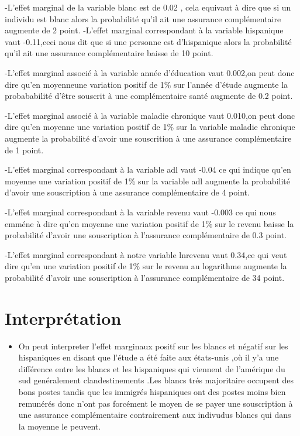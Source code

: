 \documentclass[
  14pt,
  french,
]{article}
\providecommand{\tightlist}{%
  \setlength{\itemsep}{0pt}\setlength{\parskip}{0pt}}
\begin{document}
-L'effet marginal de la variable blanc est de 0.02 , cela equivaut à
dire que si un individu est blanc alors la probabilité qu'il ait une
assurance complémentaire augmente de 2 point. -L'effet marginal
correspondant à la variable hispanique vaut -0.11,ceci nous dit que si
une personne est d'hispanique alors la probabilité qu'il ait une
assurance complémentaire baisse de 10 point.

-L'effet marginal associé à la variable année d'éducation vaut 0.002,on
peut donc dire qu'en moyenneune variation positif de 1\% sur l'année
d'étude augmente la probababilité d'être souscrit à une complémentaire
santé augmente de 0.2 point.

-L'effet marginal associé à la variable maladie chronique vaut 0.010,on
peut donc dire qu'en moyenne une variation positif de 1\% sur la
variable maladie chronique augmente la probabilité d'avoir une
souscrition à une assurance complémentaire de 1 point.

-L'effet marginal correspondant à la variable adl vaut -0.04 ce qui
indique qu'en moyenne une variation positif de 1\% sur la variable adl
augmente la probabilité d'avoir une souscription à une assurance
complémentaire de 4 point.

-L'effet marginal correspondant à la variable revenu vaut -0.003 ce qui
nous emméne à dire qu'en moyenne une variation positif de 1\% sur le
revenu baisse la probabilité d'avoir une souscription à l'assurance
complémentaire de 0.3 point.

-L'effet marginal correspondant à notre variable lnrevenu vaut 0.34,ce
qui veut dire qu'en une variation positif de 1\% sur le revenu au
logarithme augmente la probabilité d'avoir une souscription à
l'assurance complémentaire de 34 point.

\hypertarget{interpruxe9tation}{%
\section{Interprétation}\label{interpruxe9tation}}

\begin{itemize}
\tightlist
\item
  On peut interpreter l'effet marginaux positf sur les blancs et négatif
  sur les hispaniques en disant que l'étude a été faite aux états-unis
  ,où il y'a une différence entre les blancs et les hispaniques qui
  viennent de l'amérique du sud genéralement clandestinements .Les
  blancs trés majoritaire occupent des bons postes tandis que les
  immigrés hispaniques ont des postes moins bien remunérés donc n'ont
  pas forcément le moyen de se payer une souscription à une assurance
  complémentaire contrairement aux indivudus blancs qui dans la moyenne
  le peuvent.
\end{itemize}
\end{document}
